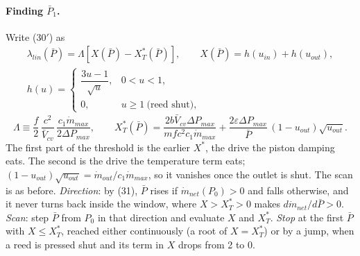 \documentclass[11pt]{article}
\begin{document}
\paragraph{Finding $\bar P_1$.} Write (30$'$) as
\begin{equation}
\begin{gathered}
\lambda_{lin}(\bar P) = \Lambda\left[X(\bar P) - X^*_T(\bar P)\right], \qquad
X(\bar P) = h(u_{in}) + h(u_{out}), \\
h(u) = \begin{cases} \dfrac{3u-1}{\sqrt u}, & 0 < u < 1, \\[6pt] 0, & u \ge 1 \ \text{(reed shut)}, \end{cases}
\end{gathered} \tag{32a}
\end{equation}
\begin{equation}
\Lambda \equiv \frac{f}{2}\,\frac{c^2}{\bar V_{cv}}\,\frac{c_1\dot m_{max}}{2\Delta P_{max}}, \qquad
X^*_T(\bar P) = \frac{2b\bar V_{cv}\Delta P_{max}}{mfc^2c_1\dot m_{max}} + \frac{2\varepsilon\Delta P_{max}}{\bar P}\,(1 - u_{out})\sqrt{u_{out}} . \tag{32b$'$}
\end{equation}
The first part of the threshold is the earlier $X^*$, the drive the piston damping eats. The second is the drive the temperature term eats; $(1 - u_{out})\sqrt{u_{out}} = \dot m_{out}/c_1\dot m_{max}$, so it vanishes once the outlet is shut. The scan is as before. \emph{Direction}: by (31), $\bar P$ rises if $\dot m_{net}(P_0) > 0$ and falls otherwise, and it never turns back inside the window, where $X > X^*_T > 0$ makes $d\dot m_{net}/d\bar P > 0$. \emph{Scan}: step $\bar P$ from $P_0$ in that direction and evaluate $X$ and $X^*_T$. \emph{Stop} at the first $\bar P$ with $X \le X^*_T$, reached either continuously (a root of $X = X^*_T$) or by a jump, when a reed is pressed shut and its term in $X$ drops from 2 to 0.
\end{document}
